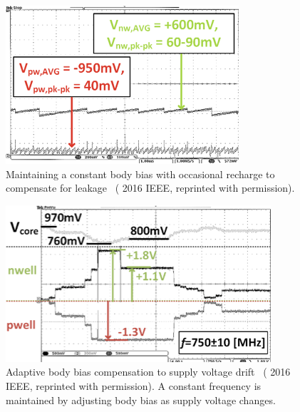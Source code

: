 \documentclass[graybox]{svmult}
\begin{document}
\begin{figure}
  \centering
  \includegraphics[width=\textwidth]{bbgen-results-tracking}
  \caption{Maintaining a constant body bias with occasional recharge to compensate for leakage~\cite{Blagojevic2016} ({\textcopyright} 2016 IEEE, reprinted with permission).}
  \label{fig:bbgen-results-tracking}
\end{figure}

\begin{figure}
  \centering
  \includegraphics[width=\textwidth]{bbgen-results-compensation}
  \caption{Adaptive body bias compensation to supply voltage drift~\cite{Blagojevic2016} ({\textcopyright} 2016 IEEE, reprinted with permission).  A constant frequency is maintained by adjusting body bias as supply voltage changes.}
  \label{fig:bbgen-results-compensation}
\end{figure}
\end{document}
